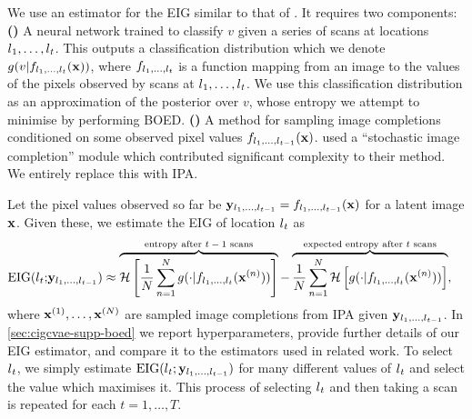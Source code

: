 We use an estimator for the EIG similar to that of \citet{harvey2019near}. It
requires two components:
\textbf{()} A neural network trained to classify $v$ given a series of
scans at locations $l{}_1,\ldots,l{}_t$. This outputs a classification distribution
which we denote $g(v|f_{l{}_1,\ldots,l{}_t}(\mathbf{x}{}))$, where $f_{l{}_1,\ldots,l{}_t}$ is a
function mapping from an image to the values of the pixels observed by scans at
$l{}_1,\ldots,l{}_t$. We use this classification distribution as an approximation of
the posterior over $v$, whose entropy we attempt to minimise by performing BOED.
\textbf{()} A method for sampling image completions conditioned on some
observed pixel values $f_{l{}_1,\ldots,l{}_{t-1}}(\mathbf{x}{})$. \citet{harvey2019near}
used a “stochastic image completion” module which contributed significant
complexity to their method. We entirely replace this with IPA.

Let the pixel values observed so far be $\mathbf{y}{}_{l{}_1,\ldots,l{}_{t-1}} =
f_{l{}_1,\ldots,l{}_{t-1}}(\mathbf{x}{})$ for a latent image $\mathbf{x}{}$. Given these, we
estimate the EIG of location $l{}_t$ as
\begin{align}
  \label{eq:new-eig}
  \text{EIG}(l{}_t;& \mathbf{y}{}_{l{}_1,\ldots,l{}_{t-1}}) \approx \overbrace{\mathcal{H} \left[ \frac{1}{N} \sum_{n=1}^N g(\cdot|f_{l{}_1,\ldots,l{}_t}(\mathbf{x}{}^{(n)})) \right]}^{\text{entropy after $t-1$ scans}} - \overbrace{\frac{1}{N} \sum_{n=1}^N  \mathcal{H} \left[ g(\cdot|f_{l{}_1,\ldots,l{}_t}(\mathbf{x}{}^{(n)})) \right]}^{\text{expected entropy after $t$ scans}},
\end{align}
where $\mathbf{x}{}^{(1)},\ldots,\mathbf{x}{}^{(N)}$ are sampled image completions from IPA
given $\mathbf{y}{}_{l{}_1,\ldots,l{}_{t-1}}$. In \cref{sec:cigcvae-supp-boed} we report
hyperparameters, provide further details of our EIG estimator, and compare it to
the estimators used in related work. To select $l{}_t$, we simply estimate
$\text{EIG}(l{}_t; \mathbf{y}{}_{l{}_1,\ldots,l{}_{t-1}})$ for many different values of
$l{}_t$ and select the value which maximises it. This process of selecting $l{}_t$
and then taking a scan is repeated for each $t=1,\ldots,T$.

